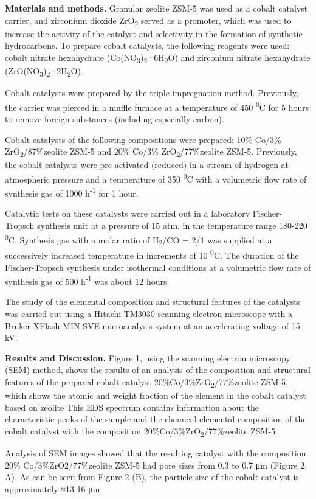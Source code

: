 \begin{multicols}{2}
{\bfseries Materials and methods.} Granular zeolite ZSM-5 was used as a
cobalt catalyst carrier, and zirconium dioxide ZrO\textsubscript{2}
served as a promoter, which was used to increase the activity of the
catalyst and selectivity in the formation of synthetic hydrocarbons. To
prepare cobalt catalysts, the following reagents were used: cobalt
nitrate hexahydrate
(Co(NO\textsubscript{3})\textsubscript{2}·6H\textsubscript{2}O) and
zirconium nitrate hexahydrate
(ZrO(NO\textsubscript{3})\textsubscript{2}·2H\textsubscript{2}O).

Cobalt catalysts were prepared by the triple impregnation method.
Previously, the carrier was pierced in a muffle furnace at a temperature
of 450 \textsuperscript{0}C for 5 hours to remove foreign substances
(including especially carbon).

Cobalt catalysts of the following compositions were prepared: 10\%
Co/3\% ZrO\textsubscript{2}/87\%zeolite ZSM-5 and 20\% Co/3\%
ZrO\textsubscript{2}/77\%zeolite ZSM-5. Previously, the cobalt catalysts
were pre-activated (reduced) in a stream of hydrogen at atmospheric
pressure and a temperature of 350 \textsuperscript{0}C with a volumetric
flow rate of synthesis gas of 1000 h\textsuperscript{-1} for 1 hour.

Catalytic tests on these catalysts were carried out in a laboratory
Fischer-Tropsch synthesis unit at a pressure of 15 atm. in the
temperature range 180-220 \textsuperscript{0}C. Synthesis gas with a
molar ratio of H\textsubscript{2}/CO = 2/1 was supplied at a
successively increased temperature in increments of 10
\textsuperscript{0}C. The duration of the Fischer-Tropsch synthesis
under isothermal conditions at a volumetric flow rate of synthesis gas
of 500 h\textsuperscript{-1} was about 12 hours.

The study of the elemental composition and structural features of the
catalysts was carried out using a Hitachi TM3030 scanning electron
microscope with a Bruker XFlash MIN SVE microanalysis system at an
accelerating voltage of 15 kV.

{\bfseries Results and Discussion.} Figure 1, using the scanning electron
microscopy (SEM) method, shows the results of an analysis of the
composition and structural features of the prepared cobalt catalyst
20\%Co/3\%ZrO\textsubscript{2}/77\%zeolite ZSM-5, which shows the atomic
and weight fraction of the element in the cobalt catalyst based on
zeolite This EDS spectrum contains information about the characteristic
peaks of the sample and the chemical elemental composition of the cobalt
catalyst with the composition 20\%Co/3\%ZrO\textsubscript{2}/77\%zeolite
ZSM-5.

Analysis of SEM images showed that the resulting catalyst with the
composition 20\% Co/3\%ZrO2/77\%zeolite ZSM-5 had pore sizes from 0.3 to
0.7 μm (Figure 2, A). As can be seen from Figure 2 (B), the particle
size of the cobalt catalyst is approximately ≈13-16 μm.
\end{multicols}

